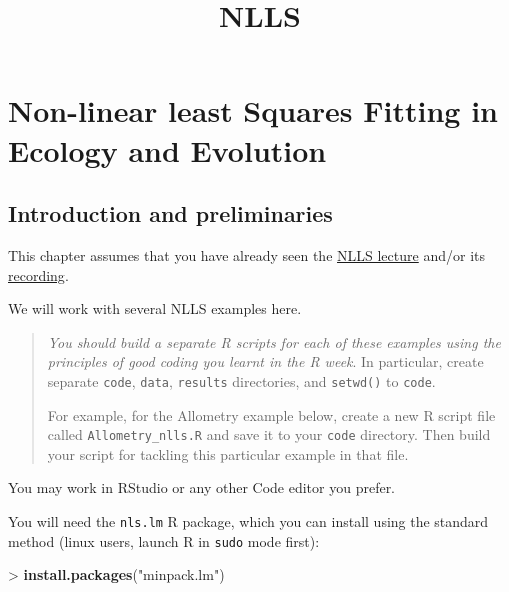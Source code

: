 \documentclass[11pt]{article}
\title{NLLS}
\newenvironment{Shaded}{}{}
\newcommand{\KeywordTok}[1]{\textcolor[rgb]{0.00,0.44,0.13}{\textbf{{#1}}}}
\newcommand{\StringTok}[1]{\textcolor[rgb]{0.25,0.44,0.63}{{#1}}}
\newcommand{\NormalTok}[1]{{#1}}
\begin{document}
    
    
    \maketitle
    
    

    
    \section{Non-linear least Squares Fitting in Ecology and Evolution
}\label{non-linear-least-squares-fitting-in-ecology-and-evolution}

    \hypertarget{toc}{}

    \subsection{Introduction and
preliminaries}\label{introduction-and-preliminaries}

This chapter assumes that you have already seen the
\href{https://github.com/mhasoba/TheMulQuaBio/blob/master/Lectures/NLLS/Pawar_NLLS.pdf}{NLLS
lecture} and/or its
\href{https://imperial.cloud.panopto.eu/Panopto/Pages/Viewer.aspx?id=2aa5bbb4-e1d0-44a1-adea-a87000aab72f}{recording}.

We will work with several NLLS examples here.

\begin{quote}
\emph{You should build a separate R scripts for each of these examples
using the principles of good coding you learnt in the R week}. In
particular, create separate \texttt{code}, \texttt{data},
\texttt{results} directories, and \texttt{setwd()} to \texttt{code}.

For example, for the Allometry example below, create a new R script file
called \texttt{Allometry\_nlls.R} and save it to your \texttt{code}
directory. Then build your script for tackling this particular example
in that file.
\end{quote}

You may work in RStudio or any other Code editor you prefer.

You will need the \texttt{nls.lm} R package, which you can install using
the standard method (linux users, launch R in \texttt{sudo} mode first):

\begin{Shaded}
\begin{Highlighting}[]
\NormalTok{>}\StringTok{ }\KeywordTok{install.packages}\NormalTok{(}\StringTok{"minpack.lm"}\NormalTok{) }
\end{Highlighting}
\end{Shaded}
\end{document}
